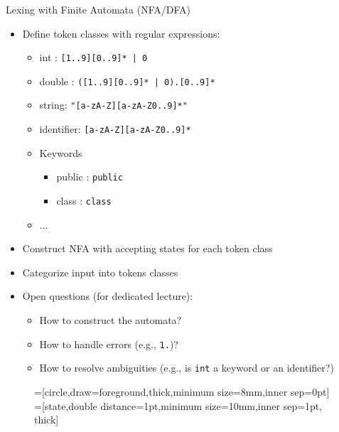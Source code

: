 \begin{frame}
	\frametitle{\insertsubsection}

	\begin{fancycolumns}[widths={50,50}]
		\begin{definition}{Lexing with Finite Automata (NFA/DFA)}
			\begin{itemize}
				\item Define token classes with regular expressions:
				      \begin{itemize}
					      \small
					      \item int : \texttt{[1..9][0..9]* | 0}
					      \item double : \texttt{([1..9][0..9]* | 0).[0..9]*}
					      \item string: \texttt{"[a-zA-Z][a-zA-Z0..9]*"}
					      \item identifier: \texttt{[a-zA-Z][a-zA-Z0..9]*}
					      \item Keywords
					            \begin{itemize}
						            \small
						            \item public : \texttt{public}
						            \item class : \texttt{class}
					            \end{itemize}
					      \item ...
				      \end{itemize}
				\item Construct NFA with accepting states for each token class
				\item Categorize input into tokens classes
				\item Open questions (for dedicated lecture):
				      \begin{itemize}
					      \item How to construct the automata?
					      \item How to handle errors (e.g., \texttt{1.})?
					      \item How to resolve ambiguities (e.g., is \texttt{int} a keyword or an identifier?)
				      \end{itemize}
			\end{itemize}
		\end{definition}
		\nextcolumn
		\begin{figure}
			\centering
			=[circle,draw=foreground,thick,minimum size=8mm,inner sep=0pt]
			=[state,double distance=1pt,minimum size=10mm,inner sep=1pt, thick]
			\begin{tikzpicture}


\end{tikzpicture}
\end{figure}
\end{fancycolumns}
\end{frame}
